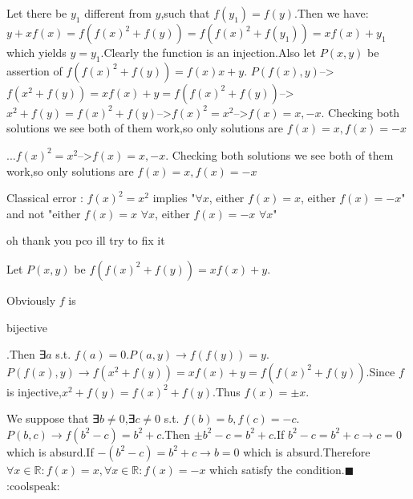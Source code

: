 \begin{solution}
	Let there be $y_1$ different from $y$,such that $f(y_1)=f(y)$.Then we have: $y+xf(x)=f(f(x)^2+f(y))=f(f(x)^2+f(y_1))=xf(x)+y_1$ which yields $y=y_1$.Clearly the function is an injection.Also let $P(x,y)$ be assertion of $f(f(x)^2+f(y))=f(x)x+y$.
$P(f(x),y)$-->$f(x^2+f(y))=xf(x)+y=f(f(x)^2+f(y))$-->$x^2+f(y)=f(x)^2+f(y)$-->$f(x)^2=x^2$-->$f(x)=x,-x$.
Checking both solutions we see both of them work,so only solutions are $f(x)=x,f(x)=-x$
\end{solution}



\begin{solution}
	\begin{tcolorbox}...$f(x)^2=x^2$-->$f(x)=x,-x$.
Checking both solutions we see both of them work,so only solutions are $f(x)=x,f(x)=-x$\end{tcolorbox}
Classical error : 
$f(x)^2=x^2$ implies "$\forall x$, either $f(x)=x$, either $f(x)=-x$"
and not "either $f(x)=x$ $\forall x$, either $f(x)=-x$ $\forall x$"
\end{solution}



\begin{solution}
	oh thank you pco
ill try to fix it
\end{solution}



\begin{solution}
	Let $P(x,y)$ be $f(f(x)^2+f(y))=xf(x)+y$.

Obviously $f$ is \begin{bolded}bijective\end{bolded}.Then ∃$a$ s.t. $f(a)=0$.$P(a,y)\rightarrow f(f(y))=y$.$P(f(x),y)\rightarrow f(x^2+f(y))=xf(x)+y=f(f(x)^2+f(y))$.Since $f$ is injective,$x^2+f(y)=f(x)^2+f(y)$.Thus $f(x)=\pm{x}$.

We suppose that ∃$b\neq 0$,∃$c\neq 0$ s.t. $f(b)=b,f(c)=-c$.$P(b,c)\rightarrow f(b^2-c)=b^2+c$.Then $\pm{b^2-c}=b^2+c$.If $b^2-c=b^2+c\rightarrow c=0$ which is absurd.If $-(b^2-c)=b^2+c\rightarrow b=0$ which is absurd.Therefore
$\boxed{\forall x\in \mathbb R:f(x)=x, \forall x\in \mathbb R:f(x)=-x}$ which satisfy the condition.$\blacksquare$ :coolspeak:
\end{solution}



